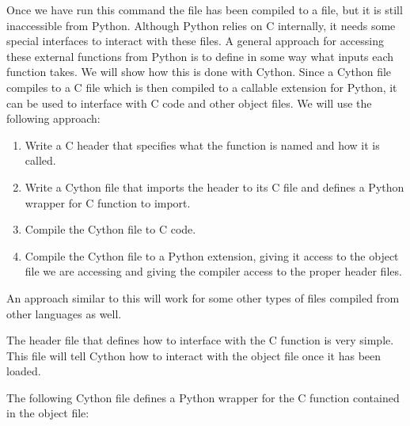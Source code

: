 Once we have run this command the file has been compiled to a \of file, but it is still inaccessible from Python.
Although Python relies on C internally, it needs some special interfaces to interact with these \of files.
A general approach for accessing these external functions from Python is to define in some way what inputs each function takes.
We will show how this is done with Cython.
Since a Cython file compiles to a C file which is then compiled to a callable extension for Python, it can be used to interface with C code and other object files.
We will use the following approach:
\begin{enumerate}
\item Write a C header that specifies what the function is named and how it is called.
\item Write a Cython file that imports the header to its C file and defines a Python wrapper for C function to import.
\item Compile the Cython file to C code.
\item Compile the Cython file to a Python extension, giving it access to the object file we are accessing and giving the compiler access to the proper header files.
\end{enumerate}

An approach similar to this will work for some other types of \of files compiled from other languages as well.

The header file that defines how to interface with the C function is very simple. 
This file will tell Cython how to interact with the object file once it has been loaded.




The following Cython file defines a Python wrapper for the C function contained in the object file:



